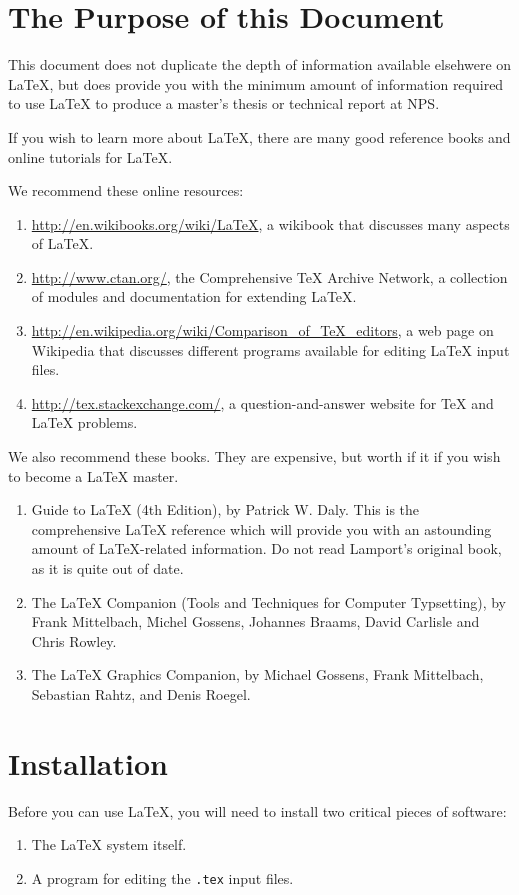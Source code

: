 \section{The Purpose of this Document}

This document does not duplicate the depth of information available elsehwere
on \LaTeX{}, but does provide you with the minimum amount of information
required to use \LaTeX{} to produce a master's thesis or technical report at
NPS.

If you wish to learn more about \LaTeX, there are many good reference books and
online tutorials for \LaTeX{}.

We recommend these online resources:
\begin{enumerate}
\item \url{http://en.wikibooks.org/wiki/LaTeX}, a wikibook that
  discusses many aspects of \LaTeX.
\item \url{http://www.ctan.org/}, the Comprehensive \TeX{} Archive
  Network, a collection of modules and documentation for extending \LaTeX{}.
\item \url{http://en.wikipedia.org/wiki/Comparison_of_TeX_editors}, a
  web page on Wikipedia that discusses different programs available for editing \LaTeX{} input files.
\item \url{http://tex.stackexchange.com/}, a question-and-answer website for \TeX{} and \LaTeX{} problems.
\end{enumerate}

We also recommend these books. They are expensive, but worth if it if
you wish to become a \LaTeX{} master.
\begin{enumerate}
\item Guide to \LaTeX{} (4th Edition), by Patrick W. Daly. This is the
  comprehensive \LaTeX{} reference which will provide you with an
  astounding amount of \LaTeX-related information. Do not read
  Lamport's original book, as it is quite out of date.
\item The \LaTeX{} Companion (Tools and Techniques for Computer
  Typsetting), by Frank Mittelbach, Michel Gossens, Johannes Braams,
  David Carlisle and Chris Rowley.
\item The \LaTeX{} Graphics Companion, by Michael Gossens, Frank
  Mittelbach, Sebastian Rahtz, and Denis Roegel.
\end{enumerate}

\section{Installation}
Before you can use \LaTeX{}, you will need to install two critical
pieces of software:
\begin{enumerate}
\item The \LaTeX{} system itself.
\item A program for editing the \verb+.tex+ input files.
\end{enumerate}

